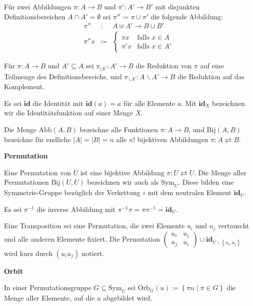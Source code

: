 \begin{defn}
Für zwei Abbildungen $\pi:A\rightarrow B$ und $\pi':A'\rightarrow B'$
mit disjunkten Definitionsbereichen $A\cap A'=\emptyset$ sei $\pi''\coloneqq\pi\cup\pi'$
die folgende Abbildung: 
\begin{eqnarray*}
\pi'' & : & A\uplus A'\rightarrow B\cup B'\\
\pi''x & \coloneqq & \begin{cases}
\pi x & \mathrm{falls}\,\,x\in A\\
\pi'x & \mathrm{falls}\,\,x\in A'
\end{cases}
\end{eqnarray*}

Für $\pi:A\rightarrow B$ und $A'\subseteq A$ sei $\pi_{\mid A'}:A'\rightarrow B$
die Reduktion von $\pi$ auf eine Teilmenge des Definitionsbereichs,
und $\pi_{\backslash A'}:A\backslash A'\rightarrow B$ die Reduktion
auf das Komplement.

Es sei $\mathbf{id}$ die Identität mit $\mathbf{id}\left(a\right)=a$
für alle Elemente $a$. Mit $\mathbf{id}_{X}$ bezeichnen wir die
Identitätsfunktion auf einer Menge $X$.

Die Menge $\mathrm{Abb}\left(A,B\right)$ bezeichne alle Funktionen
$\pi:A\rightarrow B$, und $\mathrm{Bij}\left(A,B\right)$ bezeichne
für endliche $\left|A\right|=\left|B\right|=n$ alle $n!$ bijektiven
Abbildungen $\pi:A\rightleftarrows B$.
\end{defn}
%
\begin{defn}
\textbf{Permutation}

Eine Permutation von $U$ ist eine bijektive Abbildung $\pi:U\rightleftarrows U$.
Die Menge aller Permutationen $\mathrm{Bij}\left(U,U\right)$ bezeichnen
wir auch als $\mathrm{Sym}_{U}$. Diese bilden eine Symmetrie-Gruppe
bezüglich der Verkettung $\circ$ mit dem neutralen Element $\mathbf{id}_{U}$.

Es sei $\pi^{-1}$ die inverse Abbildung mit $\pi^{-1}\pi=\pi\pi^{-1}=\mathbf{id}_{U}$.

Eine Transposition sei eine Permutation, die zwei Elemente $u_{i}$
und $u_{j}$ vertauscht und alle anderen Elemente fixiert. Die Permutation
$\left(\begin{array}{cc}
u_{i} & u_{j}\\
u_{j} & u_{i}
\end{array}\right)\cup\mathbf{id}_{U\backslash\left\{ u_{i},u_{j}\right\} }$ wird kurz durch $\left(u_{i}u_{j}\right)$ notiert.
\end{defn}
%
\begin{defn}
\textbf{\label{def:orbit}Orbit}

In einer Permutationsgruppe $G\subseteq\mathrm{Sym}_{U}$ sei $\mathrm{Orb}_{G}\left(u\right)\coloneqq\left\{ \pi u\mid\pi\in G\right\} $
die Menge aller Elemente, auf die $u$ abgebildet wird.
\end{defn}

